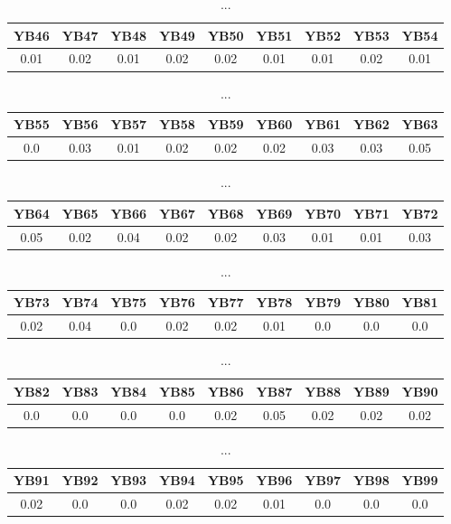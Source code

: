 \documentclass[]{article}
\begin{document}
\begin{table}[h]
	\centering
	\begin{tabular}{|c|c|c|c|c|c|c|c|c|}
		\hline
		YB46 & YB47 & YB48 & YB49 & YB50 & YB51 & YB52 & YB53 & YB54 \\
		\hline
		0.01 & 0.02 & 0.01 & 0.02 & 0.02 & 0.01 & 0.01 & 0.02 & 0.01 \\
		\hline
	\end{tabular}
	\caption{...}
\end{table}
\begin{table}[h]
	\centering
	\begin{tabular}{|c|c|c|c|c|c|c|c|c|}
		\hline
		YB55 & YB56 & YB57 & YB58 & YB59 & YB60 & YB61 & YB62 & YB63 \\
		\hline
		0.0  & 0.03 & 0.01 & 0.02 & 0.02 & 0.02 & 0.03 & 0.03 & 0.05 \\
		\hline
	\end{tabular}
	\caption{...}
\end{table}
\begin{table}[h]
	\centering
	\begin{tabular}{|c|c|c|c|c|c|c|c|c|}
		\hline
		YB64 & YB65 & YB66 & YB67 & YB68 & YB69 & YB70 & YB71 & YB72 \\
		\hline
		0.05 & 0.02 & 0.04 & 0.02 & 0.02 & 0.03 & 0.01 & 0.01 & 0.03 \\
		\hline
	\end{tabular}
	\caption{...}
\end{table}
\begin{table}[h]
	\centering
	\begin{tabular}{|c|c|c|c|c|c|c|c|c|}
		\hline
		YB73 & YB74 & YB75 & YB76 & YB77 & YB78 & YB79 & YB80 & YB81 \\
		\hline
		0.02 & 0.04 & 0.0  & 0.02 & 0.02 & 0.01 & 0.0  & 0.0  & 0.0  \\
		\hline
	\end{tabular}
	\caption{...}
\end{table}
\begin{table}[h]
	\centering
	\begin{tabular}{|c|c|c|c|c|c|c|c|c|}
		\hline
		YB82 & YB83 & YB84 & YB85 & YB86 & YB87 & YB88 & YB89 & YB90 \\
		\hline
		0.0  & 0.0  & 0.0  & 0.0  & 0.02 & 0.05 & 0.02 & 0.02 & 0.02 \\
		\hline
	\end{tabular}
	\caption{...}
\end{table}
\begin{table}[h]
	\centering
	\begin{tabular}{|c|c|c|c|c|c|c|c|c|}
		\hline
		YB91 & YB92 & YB93 & YB94 & YB95 & YB96 & YB97 & YB98 & YB99 \\
		\hline
		0.02 & 0.0  & 0.0  & 0.02 & 0.02 & 0.01 & 0.0  & 0.0  & 0.0  \\
		\hline
	\end{tabular}
	\caption{...}
\end{table}
\end{document}
